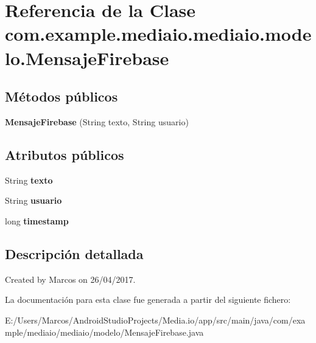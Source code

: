 \hypertarget{classcom_1_1example_1_1mediaio_1_1mediaio_1_1modelo_1_1_mensaje_firebase}{}\section{Referencia de la Clase com.\+example.\+mediaio.\+mediaio.\+modelo.\+Mensaje\+Firebase}
\label{classcom_1_1example_1_1mediaio_1_1mediaio_1_1modelo_1_1_mensaje_firebase}
\subsection*{Métodos públicos}
\begin{DoxyCompactItemize}
\item 
\mbox{\label{classcom_1_1example_1_1mediaio_1_1mediaio_1_1modelo_1_1_mensaje_firebase_a7f5074b5f9a9b3692bd90b2fd2f037b8}} 
{\bfseries Mensaje\+Firebase} (String texto, String usuario)
\end{DoxyCompactItemize}
\subsection*{Atributos públicos}
\begin{DoxyCompactItemize}
\item 
\mbox{\label{classcom_1_1example_1_1mediaio_1_1mediaio_1_1modelo_1_1_mensaje_firebase_ad0458999666994872769e63bb9401b03}} 
String {\bfseries texto}
\item 
\mbox{\label{classcom_1_1example_1_1mediaio_1_1mediaio_1_1modelo_1_1_mensaje_firebase_aa3ff15def368052a2adc3a29b18f35b4}} 
String {\bfseries usuario}
\item 
\mbox{\label{classcom_1_1example_1_1mediaio_1_1mediaio_1_1modelo_1_1_mensaje_firebase_a5bf7de4bf4b3a8526f01c77d2435d6ac}} 
long {\bfseries timestamp}
\end{DoxyCompactItemize}


\subsection{Descripción detallada}
Created by Marcos on 26/04/2017. 

La documentación para esta clase fue generada a partir del siguiente fichero\+:\begin{DoxyCompactItemize}
\item 
E\+:/\+Users/\+Marcos/\+Android\+Studio\+Projects/\+Media.\+io/app/src/main/java/com/example/mediaio/mediaio/modelo/Mensaje\+Firebase.\+java\end{DoxyCompactItemize}
